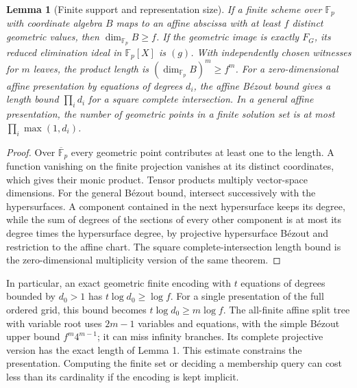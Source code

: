 \documentclass[11pt]{article}
\newtheorem{lemma}[theorem]{Lemma}
\newcommand{\Fp}{\mathbb F_p}
\newcommand{\kb}{\overline{\mathbb F}_p}
\begin{document}
\begin{lemma}[Finite support and representation size]
If a finite scheme over \(\Fp\) with coordinate algebra \(B\) maps to an affine abscissa with at least \(f\) distinct geometric values, then \(\dim_{\Fp}B\ge f\). If the geometric image is exactly \(F_G\), its reduced elimination ideal in \(\Fp[X]\) is \((g)\). With independently chosen witnesses for \(m\) leaves, the product length is \((\dim_{\Fp}B)^m\ge f^m\). For a zero-dimensional affine presentation by equations of degrees \(d_i\), the affine B\'ezout bound gives a length bound \(\prod_i d_i\) for a square complete intersection. In a general affine presentation, the number of geometric points in a finite solution set is at most \(\prod_i\max(1,d_i)\).
\end{lemma}
\begin{proof}
Over \(\kb\) every geometric point contributes at least one to the length. A function vanishing on the finite projection vanishes at its distinct coordinates, which gives their monic product. Tensor products multiply vector-space dimensions. For the general B\'ezout bound, intersect successively with the hypersurfaces. A component contained in the next hypersurface keeps its degree, while the sum of degrees of the sections of every other component is at most its degree times the hypersurface degree, by projective hypersurface B\'ezout and restriction to the affine chart. The square complete-intersection length bound is the zero-dimensional multiplicity version of the same theorem.
\end{proof}

In particular, an exact geometric finite encoding with \(t\) equations of degrees bounded by \(d_0>1\) has \(t\log d_0\ge\log f\). For a single presentation of the full ordered grid, this bound becomes \(t\log d_0\ge m\log f\). The all-finite affine split tree with variable root uses \(2m-1\) variables and equations, with the simple B\'ezout upper bound \(f^m4^{m-1}\); it can miss infinity branches. Its complete projective version has the exact length of Lemma 1. This estimate constrains the presentation. Computing the finite set or deciding a membership query can cost less than its cardinality if the encoding is kept implicit.
\end{document}
